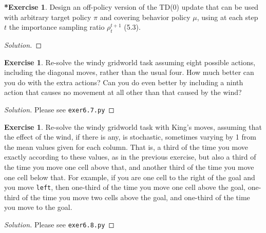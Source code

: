 \documentclass[oneside,11pt]{article}
\theoremstyle{definition}
\newtheorem{exer}[thm]{Exercise}
\newtheorem{exerstar}[thm]{*Exercise}
\newenvironment{solution}
{\renewcommand\qedsymbol{$\blacksquare$}\begin{proof}[Solution]} {\end{proof}}
\begin{document}
\begin{exerstar}
Design an off-policy version of the TD(0) update that can be used
with arbitrary target policy $\pi$ and covering behavior policy $\mu$, using at each step $t$ the importance sampling ratio $\rho_t^{t+1}$ (5.3).
\end{exerstar}

\begin{shaded}
\begin{solution} 


\end{solution} 
\end{shaded}


\begin{exer}
Re-solve the windy gridworld task assuming eight possible actions, including the diagonal moves, rather than the usual four. How much better can you do with the extra actions? Can you do even better by including a ninth action that causes no movement at all other than that caused by the wind?
\end{exer}

\begin{shaded}
\begin{solution} 
Please see \texttt{exer6.7.py}


\end{solution} 
\end{shaded}


\begin{exer}
Re-solve the windy gridworld task with King's moves, assuming that the effect of the wind, if there is any, is stochastic, sometimes varying by 1 from the mean values given for each column. That is, a third of the time you move exactly according to these values, as in the previous exercise, but also a third of the time you move one cell above that, and another third of the time you move one cell below that. For example, if you are one cell to the right of the goal and you move \texttt{left}, then one-third of the time you move one cell above the goal, one-third of the time you move two cells above the goal, and one-third of the time you move to the goal.
\end{exer}

\begin{shaded}
\begin{solution} 
Please see \texttt{exer6.8.py}


\end{solution} 
\end{shaded}
\end{document}
